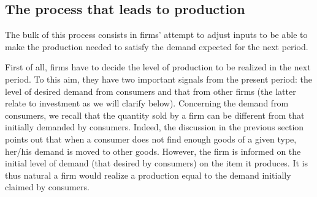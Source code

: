 \documentclass{book}
\begin{document}
\subsection{The process that leads to production}

The bulk of this process consists in firms' attempt to adjust inputs to be able to make the production needed to satisfy the demand expected for the next period.

First of all, firms have to decide the level of production to be realized in the next period. To this aim, they have two important signals from the present period: the level of desired demand from consumers and that from other firms (the latter relate to investment as we will clarify below).
Concerning the demand from consumers, we recall that the quantity sold by a firm can be different from that initially demanded by consumers. Indeed, the discussion in the previous section points out that when a consumer does not find enough goods of a given type, her/his demand is moved
to other goods.
However, the firm is informed on the initial level of demand (that desired by consumers) on the item it produces. It is thus natural a firm would realize a production equal to the demand initially claimed by consumers.  

\end{document}
